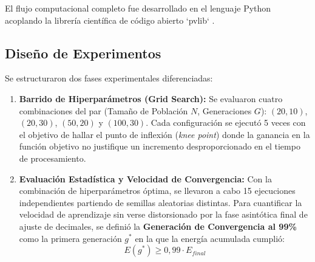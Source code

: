 \documentclass[12pt, a4paper, twocolumn]{article}
\begin{document}
El flujo computacional completo fue desarrollado en el lenguaje Python acoplando la librería científica de código abierto `pvlib` \cite{pvlib}.

\subsection{Diseño de Experimentos}
Se estructuraron dos fases experimentales diferenciadas:
\begin{enumerate}
    \item \textbf{Barrido de Hiperparámetros (Grid Search):} Se evaluaron cuatro combinaciones del par (Tamaño de Población $N$, Generaciones $G$): $(20, 10)$, $(20, 30)$, $(50, 20)$ y $(100, 30)$. Cada configuración se ejecutó 5 veces con el objetivo de hallar el punto de inflexión (\textit{knee point}) donde la ganancia en la función objetivo no justifique un incremento desproporcionado en el tiempo de procesamiento.
    \item \textbf{Evaluación Estadística y Velocidad de Convergencia:} Con la combinación de hiperparámetros óptima, se llevaron a cabo 15 ejecuciones independientes partiendo de semillas aleatorias distintas. Para cuantificar la velocidad de aprendizaje sin verse distorsionado por la fase asintótica final de ajuste de decimales, se definió la \textbf{Generación de Convergencia al 99\%} como la primera generación $g^*$ en la que la energía acumulada cumplió:
    \begin{equation}
    E(g^*) \ge 0,99 \cdot E_{final}
    \end{equation}
\end{enumerate}

\begin{table}[htbp]
\centering
\caption{Parámetros de configuración del Algoritmo Genético.}
\label{tab:param_ga}
\end{table}
\end{document}
